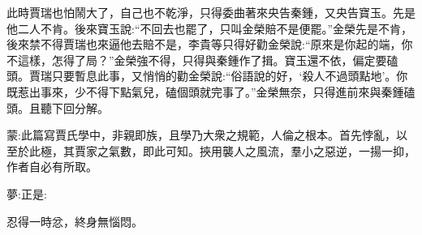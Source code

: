 \begin{parag}
    此時賈瑞也怕鬧大了，自己也不乾淨，只得委曲著來央告秦鍾，又央告寶玉。先是他二人不肯。後來寶玉說:“不回去也罷了，只叫金榮賠不是便罷。”金榮先是不肯，後來禁不得賈瑞也來逼他去賠不是，李貴等只得好勸金榮說:“原來是你起的端，你不這樣，怎得了局？”金榮強不得，只得與秦鍾作了揖。寶玉還不依，偏定要磕頭。賈瑞只要暫息此事，又悄悄的勸金榮說:“俗語說的好，‘殺人不過頭點地’。你既惹出事來，少不得下點氣兒，磕個頭就完事了。”金榮無奈，只得進前來與秦鍾磕頭。且聽下回分解。
\end{parag}


\begin{parag}
    \begin{note}蒙:此篇寫賈氏學中，非親即族，且學乃大衆之規範，人倫之根本。首先悖亂，以至於此極，其賈家之氣數，即此可知。挾用襲人之風流，羣小之惡逆，一揚一抑，作者自必有所取。\end{note}
\end{parag}


\begin{parag}
    \begin{note}夢:正是:\end{note}
\end{parag}


\begin{parag}
    \begin{note}忍得一時忿，終身無惱悶。\end{note}
\end{parag}

